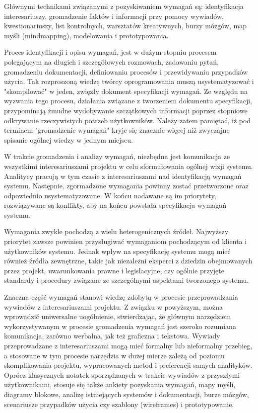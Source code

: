         Głównymi technikami związanymi z pozyskiwaniem wymagań są: identyfikacja interesariuszy, gromadzenie faktów i informacji przy pomocy wywiadów, kwestionariuszy, list kontrolnych, warsztatów kreatywnych, burzy mózgów, map myśli (mindmapping), modelowania i prototypowania.
        
        Proces identyfikacji i opisu wymagań, jest w dużym stopniu procesem polegającym na długich i szczegółowych rozmowach, zadawaniu pytań, gromadzeniu dokumentacji, definiowaniu procesów i przewidywaniu przypadków użycia. Tak rozproszoną wiedzę twórcy oprogramowania muszą usystematyzować i "skompilować" w jeden, zwięzły dokument specyfikacji wymagań. Ze względu na wyzwania tego procesu, działania związane z tworzeniem dokumentu specyfikacji, przypominają żmudne wydobywanie szczątkowych informacji poprzez stopniowe odkrywanie rzeczywistych potrzeb użytkowników. Należy zatem pamiętać, iż pod terminem "gromadzenie wymagań" kryje się znacznie więcej niż zwyczajne spisanie ogólnej wiedzy w jednym miejscu.  

        W trakcie gromadzenia i analizy wymagań, niezbędna jest komunikacja ze wszystkimi interesariuszami projektu w celu sformułowania ogólnej wizji systemu. Analitycy pracują w tym czasie z interesariuszami nad identyfikacją wymagań systemu. Następnie, zgormadzone wymagania powinny zostać przetworzone oraz odpowiednio usystematyzowane. W końcu nadawane są im priorytety, rozwiązywane są konflikty, aby na końcu powstała specyfikacja wymagań systemu.

        Wymagania zwykle pochodzą z wielu heterogenicznych źródeł. Najwyższy priorytet zawsze powinien przysługiwać wymaganiom pochodzącym od klienta i użytkowników systemu. Jednak wpływ na specyfikację systemu mogą mieć również źródła zewnętrzne, takie jak niezależni eksperci z dziedzin obejmowanych przez projekt, uwarunkowania prawne i legislacyjne, czy ogólnie przyjęte standardy i procedury związane ze szczególnymi aspektami tworzonego systemu.

        Znaczna część wymagań stanowi wiedzę zdobytą w procesie przeprowadzania wywiadów z interesariuszami projektu. Z związku w powyższym, można wprowadzić uniwersalne uogólnienie, stwierdzając, że głównym narzędziem wykorzystywanym w procesie gromadzenia wymagań jest szeroko rozumiana komunikacja, zarówno werbalna, jak też graficzna i tekstowa. Wywiady przeprowadzane z interesariuszami mogą mieć formalny lub nieformalny przebieg, a stosowane w tym procesie narzędzia w dużej mierze zależą od poziomu skomplikowania projektu, wypracowanych metod i preferencji samych analityków. Oprócz klasycznych notatek sporządzanych w trakcie wywiadów z przyszłymi użytkownikami, stosuje się także ankiety pozyskania wymagań, mapy myśli, diagramy blokowe, analizę istniejących systemów i dokumentacji, burze mózgów, scenariusze przypadków użycia czy szablony (wireframes) i prototypowanie. 

